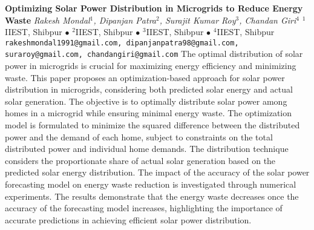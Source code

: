 
    \begin{conf-abstract}[]
        {\textbf{Optimizing Solar Power Distribution in Microgrids to Reduce Energy Waste}}
        {\textit{Rakesh Mondal$^{1}$, Dipanjan Patra$^{2}$, Surajit Kumar Roy$^{3}$, Chandan Giri$^{4}$}}
        {$^{1}$IIEST, Shibpur $\bullet$ $^{2}$IIEST, Shibpur $\bullet$ $^{3}$IIEST, Shibpur $\bullet$ $^{4}$IIEST, Shibpur}
        {\texttt{rakeshmondal1991@gmail.com, dipanjanpatra98@gmail.com, suraroy@gmail.com, chandangiri@gmail.com}}
        {The optimal distribution of solar power in microgrids is crucial for maximizing energy efficiency and minimizing waste. This paper proposes an optimization-based approach for solar power distribution in microgrids, considering both predicted solar energy and actual solar generation. The objective is to optimally distribute solar power among homes in a microgrid while ensuring minimal energy waste. The optimization model is formulated to minimize the squared difference between the distributed power and the demand of each home, subject to constraints on the total distributed power and individual home demands. The distribution technique considers the proportionate share of actual solar generation based on the predicted solar energy distribution. The impact of the accuracy of the solar power forecasting model on energy waste reduction is investigated through numerical experiments. The results demonstrate that the energy waste decreases once the accuracy of the forecasting model increases, highlighting the importance of accurate predictions in achieving efficient solar power distribution.}
    \end{conf-abstract}
        